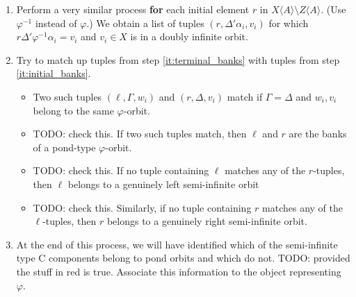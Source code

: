 \documentclass[12pt]{article}
\let\phi\varphi
\def\ofA{\langle A \rangle}
\newcommand\alert\textbf
\newcommand\todo[1]{{\color{red}TODO: #1}}
\begin{document}
\begin{enumerate}
\item \label{it:initial_banks}
	Perform a very similar process \alert{for} each initial element $r$ in $X\ofA \setminus Z\ofA$. (Use $\phi^{-1}$ instead of $\phi$.) We obtain a list of tuples $(r, \Delta'\alpha_i, v_i)$ for which $r\Delta'\phi^{-1}\alpha_i = v_i$ and $v_i \in X$ is in a doubly infinite orbit.

\item Try to match up tuples from step \ref{it:terminal_banks} with tuples from step \ref{it:initial_banks}.
	\begin{itemize}
		\item Two such tuples $(\ell, \Gamma, w_i)$ and $(r, \Delta, v_i)$ match if $\Gamma=\Delta$ and $w_i, v_i$ belong to the same $\phi$-orbit. 
		
		\item \todo{check this.} If two such tuples match, then $\ell$ and $r$ are the banks of a pond-type $\phi$-orbit.
		\item \todo{check this.} If no tuple containing $\ell$ matches any of the $r$-tuples, then $\ell$ belongs to a genuinely left semi-infinite orbit
		\item \todo{check this.} Similarly, if no tuple containing $r$ matches any of the $\ell$-tuples, then $r$ belongs to a genuinely right semi-infinite orbit.
		
	\end{itemize}
\item At the end of this process, we will have identified which of the semi-infinite type C components belong to pond orbits and which do not.
\todo{provided the stuff in red is true.} Associate this information to the object representing $\phi$.
\end{enumerate}
\end{document}
